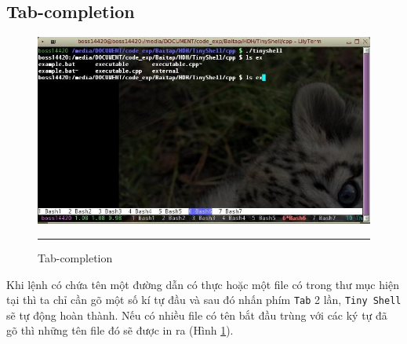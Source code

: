 \documentclass[a4paper,12pt]{report}
\begin{document}
        \subsection{Tab-completion}
        \begin{figure}
            \centering
            \includegraphics[scale=0.7]{ts2}
            \rule{35em}{0.5pt}
            \caption{Tab-completion}
            \label{fig:ts2}
        \end{figure}
        Khi lệnh có chứa tên một đường dẫn có thực hoặc một file có trong
        thư mục hiện tại thì ta chỉ cần gõ một số kí tự đầu và sau đó nhấn
        phím \texttt{Tab} 2 lần, \texttt{Tiny Shell} sẽ tự động hoàn thành.
        Nếu có nhiều file có tên bắt đầu trùng với các ký tự đã gõ thì
        những tên file đó sẽ được in ra (Hình \ref{fig:ts2}).
\end{document}
